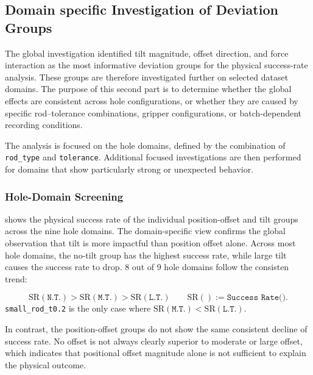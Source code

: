 \newpage
\subsection{Domain specific Investigation of Deviation Groups}
\label{subsec:da1_domain_investigation}

The global investigation identified tilt magnitude, offset direction, and force interaction as the most informative deviation groups for the physical success-rate analysis. These groups are therefore investigated further on selected dataset domains. The purpose of this second part is to determine whether the global effects are consistent across hole configurations, or whether they are caused by specific rod--tolerance combinations, gripper configurations, or batch-dependent recording conditions.

The analysis is focused on the hole domains, defined by the combination of \texttt{rod\_type} and \texttt{tolerance}. Additional focused investigations are then performed for domains that show particularly strong or unexpected behavior.

\subsubsection{Hole-Domain Screening}
\label{subsubsec:da1_hole_domain_screening}

 shows the physical success rate of the individual position-offset and tilt groups across the nine hole domains. The domain-specific view confirms the global observation that tilt is more impactful than position offset alone. Across most hole domains, the no-tilt group has the highest success rate, while large tilt causes the success rate to drop. 8 out of 9 hole domains follow the consisten trend:

\begin{equation}
    \text{SR}(\texttt{N.T.}) > \text{SR}(\texttt{M.T.}) > \text{SR}(\texttt{L.T.})
    \qquad
    \text{SR}() := \texttt{Success Rate()}.
    \label{eq:tilt_trend}
\end{equation}
\texttt{small\_rod\_t0.2} is the only case where $\text{SR}(\texttt{M.T.}) < \text{SR}(\texttt{L.T.})$.

In contrast, the position-offset groups do not show the same consistent decline of success rate. No offset is not always clearly superior to moderate or large offset, which indicates that positional offset magnitude alone is not sufficient to explain the physical outcome.

